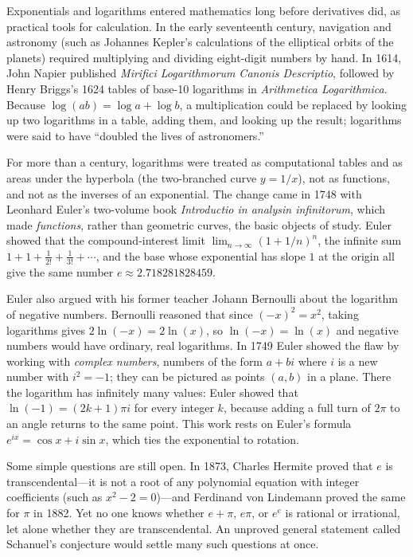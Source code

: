 \begin{historybox}
Exponentials and logarithms entered mathematics long before derivatives did, as practical tools for calculation. In the early seventeenth century, navigation and astronomy (such as Johannes Kepler's calculations of the elliptical orbits of the planets) required multiplying and dividing eight-digit numbers by hand. In 1614, John Napier published \emph{Mirifici Logarithmorum Canonis Descriptio}, followed by Henry Briggs's 1624 tables of base-10 logarithms in \emph{Arithmetica Logarithmica}. Because $\log(ab) = \log a + \log b$, a multiplication could be replaced by looking up two logarithms in a table, adding them, and looking up the result; logarithms were said to have ``doubled the lives of astronomers.''

For more than a century, logarithms were treated as computational tables and as areas under the hyperbola (the two-branched curve $y = 1/x$), not as functions, and not as the inverses of an exponential. The change came in 1748 with Leonhard Euler's two-volume book \emph{Introductio in analysin infinitorum}, which made \emph{functions}, rather than geometric curves, the basic objects of study. Euler showed that the compound-interest limit $\lim_{n\to\infty}(1 + 1/n)^n$, the infinite sum $1 + 1 + \tfrac{1}{2!} + \tfrac{1}{3!} + \cdots$, and the base whose exponential has slope $1$ at the origin all give the same number $e \approx 2.718281828459$.

Euler also argued with his former teacher Johann Bernoulli about the logarithm of negative numbers. Bernoulli reasoned that since $(-x)^2 = x^2$, taking logarithms gives $2\ln(-x) = 2\ln(x)$, so $\ln(-x) = \ln(x)$ and negative numbers would have ordinary, real logarithms. In 1749 Euler showed the flaw by working with \emph{complex numbers}, numbers of the form $a + bi$ where $i$ is a new number with $i^2 = -1$; they can be pictured as points $(a,b)$ in a plane. There the logarithm has infinitely many values: Euler showed that $\ln(-1) = (2k+1)\pi i$ for every integer $k$, because adding a full turn of $2\pi$ to an angle returns to the same point. This work rests on Euler's formula $e^{ix} = \cos x + i\sin x$, which ties the exponential to rotation.

Some simple questions are still open. In 1873, Charles Hermite proved that $e$ is transcendental---it is not a root of any polynomial equation with integer coefficients (such as $x^2 - 2 = 0$)---and Ferdinand von Lindemann proved the same for $\pi$ in 1882. Yet no one knows whether $e + \pi$, $e\pi$, or $e^e$ is rational or irrational, let alone whether they are transcendental. An unproved general statement called Schanuel's conjecture would settle many such questions at once.
\end{historybox}

